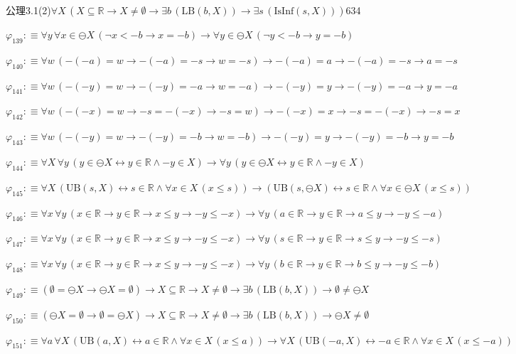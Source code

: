 \begin{fullproof}{公理3.1(2)}{$\forall X\,(X \subseteq \mathbb{R} \to X \neq \emptyset \to \exists b\,(\mathrm{LB}(b,X)) \to \exists s\,(\mathrm{IsInf}(s,X)))$}{634}
\begin{abbrevlist}
\item $\varphi_{139} :\equiv \forall y\,\forall x \in \ominus X\,(\neg x < -b \to x = -b) \to \forall y \in \ominus X\,(\neg y < -b \to y = -b)$
\item $\varphi_{140} :\equiv \forall w\,(-(-a) = w \to -(-a) = -s \to w = -s) \to -(-a) = a \to -(-a) = -s \to a = -s$
\item $\varphi_{141} :\equiv \forall w\,(-(-y) = w \to -(-y) = -a \to w = -a) \to -(-y) = y \to -(-y) = -a \to y = -a$
\item $\varphi_{142} :\equiv \forall w\,(-(-x) = w \to -s = -(-x) \to -s = w) \to -(-x) = x \to -s = -(-x) \to -s = x$
\item $\varphi_{143} :\equiv \forall w\,(-(-y) = w \to -(-y) = -b \to w = -b) \to -(-y) = y \to -(-y) = -b \to y = -b$
\item $\varphi_{144} :\equiv \forall X\,\forall y\,(y \in \ominus X \leftrightarrow y \in \mathbb{R} \land -y \in X) \to \forall y\,(y \in \ominus X \leftrightarrow y \in \mathbb{R} \land -y \in X)$
\item $\varphi_{145} :\equiv \forall X\,(\mathrm{UB}(s,X) \leftrightarrow s \in \mathbb{R} \land \forall x \in X\,(x \leq s)) \to (\mathrm{UB}(s,\ominus X) \leftrightarrow s \in \mathbb{R} \land \forall x \in \ominus X\,(x \leq s))$
\item $\varphi_{146} :\equiv \forall x\,\forall y\,(x \in \mathbb{R} \to y \in \mathbb{R} \to x \leq y \to -y \leq -x) \to \forall y\,(a \in \mathbb{R} \to y \in \mathbb{R} \to a \leq y \to -y \leq -a)$
\item $\varphi_{147} :\equiv \forall x\,\forall y\,(x \in \mathbb{R} \to y \in \mathbb{R} \to x \leq y \to -y \leq -x) \to \forall y\,(s \in \mathbb{R} \to y \in \mathbb{R} \to s \leq y \to -y \leq -s)$
\item $\varphi_{148} :\equiv \forall x\,\forall y\,(x \in \mathbb{R} \to y \in \mathbb{R} \to x \leq y \to -y \leq -x) \to \forall y\,(b \in \mathbb{R} \to y \in \mathbb{R} \to b \leq y \to -y \leq -b)$
\item $\varphi_{149} :\equiv (\emptyset = \ominus X \to \ominus X = \emptyset) \to X \subseteq \mathbb{R} \to X \neq \emptyset \to \exists b\,(\mathrm{LB}(b,X)) \to \emptyset \neq \ominus X$
\item $\varphi_{150} :\equiv (\ominus X = \emptyset \to \emptyset = \ominus X) \to X \subseteq \mathbb{R} \to X \neq \emptyset \to \exists b\,(\mathrm{LB}(b,X)) \to \ominus X \neq \emptyset$
\item $\varphi_{151} :\equiv \forall a\,\forall X\,(\mathrm{UB}(a,X) \leftrightarrow a \in \mathbb{R} \land \forall x \in X\,(x \leq a)) \to \forall X\,(\mathrm{UB}(-a,X) \leftrightarrow -a \in \mathbb{R} \land \forall x \in X\,(x \leq -a))$

\end{abbrevlist}
\end{fullproof}
